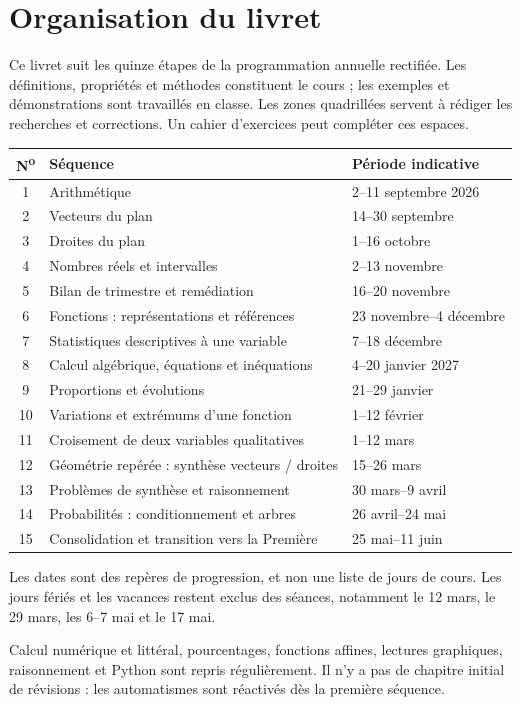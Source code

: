 \documentclass[11pt,a4paper,oneside]{article}
\newif\ifprof
\newcommand{\prof}[1]{\ifprof\begin{methode}[Repères pour le professeur]#1\end{methode}\fi}
\begin{document}
\section*{Organisation du livret}
Ce livret suit les quinze étapes de la programmation annuelle rectifiée. Les définitions, propriétés et méthodes constituent le cours ; les exemples et démonstrations sont travaillés en classe. Les zones quadrillées servent à rédiger les recherches et corrections. Un cahier d'exercices peut compléter ces espaces.
\begin{center}\small\renewcommand{\arraystretch}{1.25}\begin{tabularx}{\linewidth}{c X l}
\textbf{N\textsuperscript{o}}&\textbf{Séquence}&\textbf{Période indicative}\\\hline
1&Arithmétique&2--11 septembre 2026\\
2&Vecteurs du plan&14--30 septembre\\
3&Droites du plan&1--16 octobre\\
4&Nombres réels et intervalles&2--13 novembre\\
5&Bilan de trimestre et remédiation&16--20 novembre\\
6&Fonctions : représentations et références&23 novembre--4 décembre\\
7&Statistiques descriptives à une variable&7--18 décembre\\
8&Calcul algébrique, équations et inéquations&4--20 janvier 2027\\
9&Proportions et évolutions&21--29 janvier\\
10&Variations et extrémums d'une fonction&1--12 février\\
11&Croisement de deux variables qualitatives&1--12 mars\\
12&Géométrie repérée : synthèse vecteurs / droites&15--26 mars\\
13&Problèmes de synthèse et raisonnement&30 mars--9 avril\\
14&Probabilités : conditionnement et arbres&26 avril--24 mai\\
15&Consolidation et transition vers la Première&25 mai--11 juin\\\hline
\end{tabularx}\end{center}
Les dates sont des repères de progression, et non une liste de jours de cours. Les jours fériés et les vacances restent exclus des séances, notamment le 12 mars, le 29 mars, les 6--7 mai et le 17 mai.
\begin{cours}
Calcul numérique et littéral, pourcentages, fonctions affines, lectures graphiques, raisonnement et Python sont repris régulièrement. Il n'y a pas de chapitre initial de révisions : les automatismes sont réactivés dès la première séquence.
\end{cours}
\prof{La programmation DOCX rectifiée est la référence d'ordre et de dates. Les bilans 5, 12, 13 et 15 sont des temps de réinvestissement. Les corrections ne doivent être dévoilées qu'après une recherche. Les exercices explicitement qualifiés de fictifs ne constituent pas des données d'enquête réelles.}
\clearpage\tableofcontents\clearpage{}\pagestyle{fancy}
\end{document}
